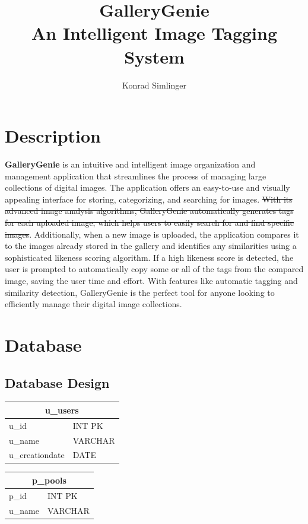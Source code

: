 \documentclass[a4paper,12pt]{article}
\author{Konrad Simlinger}
\title{GalleryGenie \\
		An Intelligent Image Tagging System}
\newcommand{\imgal}{GalleryGenie}
\begin{document}
\maketitle
\newpage
\tableofcontents
\newpage

\section{Description}
\textbf{\imgal{}} is an intuitive and intelligent image organization and management application that streamlines the process of managing large collections of digital images. The application offers an easy-to-use and visually appealing interface for storing, categorizing, and searching for images.  \st{With its advanced image analysis algorithms, GalleryGenie automatically generates tags for each uploaded image, which helps users to easily search for and find specific images}. Additionally, when a new image is uploaded, the application compares it to the images already stored in the gallery and identifies any similarities using a sophisticated likeness scoring algorithm. If a high likeness score is detected, the user is prompted to automatically copy some or all of the tags from the compared image, saving the user time and effort. With features like automatic tagging and similarity detection, \imgal{} is the perfect tool for anyone looking to efficiently manage their digital image collections.

\newpage
\section{Database}
\subsection{Database Design}

\begin{table}[h]
	\begin{tabular}{ll}
		\multicolumn{2}{c}{u\_users}                   \\ \hline
		\multicolumn{1}{l|}{u\_id}           & INT PK     \\
		\multicolumn{1}{l|}{u\_name}         & VARCHAR \\
		\multicolumn{1}{l|}{u\_creationdate} & DATE   
	\end{tabular}
\end{table}

\begin{table}[h]
	\begin{tabular}{ll}
		\multicolumn{2}{c}{p\_pools}           \\ \hline
		\multicolumn{1}{l|}{p\_id}   & INT PK     \\
		\multicolumn{1}{l|}{u\_name} & VARCHAR
	\end{tabular}
\end{table}
\end{document}
